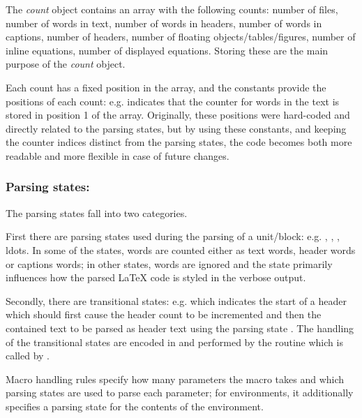 \documentclass{article}
\newcommand\Obj[1]{\textsl{#1}}
\newcommand\wild{\ldots}
\begin{document}
The \Obj{count} object contains an array with the following counts: number of files, number of words in text, number of words in headers, number of words in captions, number of headers, number of floating objects/tables/figures, number of inline equations, number of displayed equations. Storing these are the main purpose of the \Obj{count} object.

Each count has a fixed position in the array, and the \code{\$CNT_\wild} constants provide the positions of each count: e.g.  indicates that the counter for words in the text is stored in position 1 of the array. Originally, these positions were hard-coded and directly related to the parsing states, but by using these constants, and keeping the counter indices distinct from the parsing states, the code becomes both more readable and more flexible in case of future changes.

\subsubsection{Parsing states: \code{\$STATE_\wild}}

The parsing states fall into two categories.

First there are parsing states used during the parsing of a unit/block: e.g. , , , ldots. In some of the states, words are counted either as text words, header words or captions words; in other states, words are ignored and the state primarily influences how the parsed \LaTeX{} code is styled in the verbose output.

Secondly, there are transitional states: e.g.  which indicates the start of a header which should first cause the header count to be incremented and then the contained text to be parsed as header text using the parsing state . The handling of the transitional states are encoded in  and performed by the  routine which is called by .

Macro handling rules specify how many parameters the macro takes and which parsing states are used to parse each parameter; for environments, it additionally specifies a parsing state for the contents of the environment.
\end{document}
